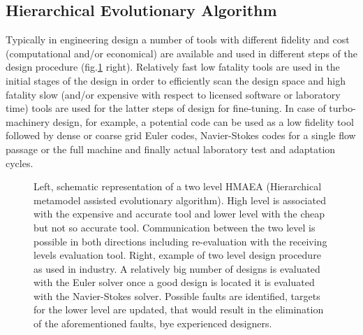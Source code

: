 \subsection{Hierarchical Evolutionary Algorithm}
Typically in engineering design a number of tools with different fidelity and cost (computational and/or economical) are available and used in different steps of the design procedure (fig.\ref{HMAEA} right). Relatively fast low fatality tools are used in the initial stages of the design in order to efficiently scan the design space and high fatality slow (and/or expensive with respect to licensed software or laboratory time) tools are used for the latter steps of design for fine-tuning. In case of turbo-machinery design, for example, a potential code can be used as a low fidelity tool followed by dense or coarse grid Euler codes, Navier-Stokes codes for a single flow passage or the full machine and finally actual laboratory test and adaptation cycles.    


\begin{figure}[h!]
\begin{minipage}[b]{1.0\linewidth}
 \centering
\end{minipage}
\caption{Left, schematic representation of a two level HMAEA (Hierarchical metamodel assisted evolutionary algorithm). High level is associated with the expensive and accurate tool and lower level with the cheap but not so accurate tool. Communication between the two level is possible in both directions including re-evaluation with the receiving levels evaluation tool. Right, example of two level design procedure as used in industry. A relatively big number of designs is evaluated with the Euler solver once a good design is located it is evaluated with the Navier-Stokes solver. Possible faults are identified, targets for the lower level are updated, that would result in the  elimination of the aforementioned faults, bye experienced designers.}
\label{HMAEA}
\end{figure} 
 
